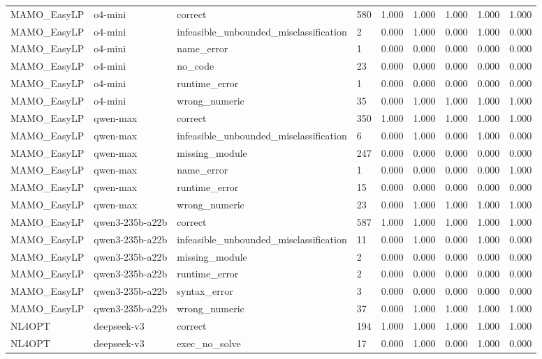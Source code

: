 \begin{table}[t]
\begin{tabular}{lllllllll}
MAMO\_EasyLP & o4-mini & correct & 580 & 1.000 & 1.000 & 1.000 & 1.000 & 1.000 \\
MAMO\_EasyLP & o4-mini & infeasible\_unbounded\_misclassification & 2 & 0.000 & 1.000 & 0.000 & 1.000 & 0.000 \\
MAMO\_EasyLP & o4-mini & name\_error & 1 & 0.000 & 0.000 & 0.000 & 0.000 & 0.000 \\
MAMO\_EasyLP & o4-mini & no\_code & 23 & 0.000 & 0.000 & 0.000 & 0.000 & 0.000 \\
MAMO\_EasyLP & o4-mini & runtime\_error & 1 & 0.000 & 0.000 & 0.000 & 0.000 & 0.000 \\
MAMO\_EasyLP & o4-mini & wrong\_numeric & 35 & 0.000 & 1.000 & 1.000 & 1.000 & 1.000 \\
MAMO\_EasyLP & qwen-max & correct & 350 & 1.000 & 1.000 & 1.000 & 1.000 & 1.000 \\
MAMO\_EasyLP & qwen-max & infeasible\_unbounded\_misclassification & 6 & 0.000 & 1.000 & 0.000 & 1.000 & 0.000 \\
MAMO\_EasyLP & qwen-max & missing\_module & 247 & 0.000 & 0.000 & 0.000 & 0.000 & 0.000 \\
MAMO\_EasyLP & qwen-max & name\_error & 1 & 0.000 & 0.000 & 0.000 & 0.000 & 1.000 \\
MAMO\_EasyLP & qwen-max & runtime\_error & 15 & 0.000 & 0.000 & 0.000 & 0.000 & 0.000 \\
MAMO\_EasyLP & qwen-max & wrong\_numeric & 23 & 0.000 & 1.000 & 1.000 & 1.000 & 1.000 \\
MAMO\_EasyLP & qwen3-235b-a22b & correct & 587 & 1.000 & 1.000 & 1.000 & 1.000 & 1.000 \\
MAMO\_EasyLP & qwen3-235b-a22b & infeasible\_unbounded\_misclassification & 11 & 0.000 & 1.000 & 0.000 & 1.000 & 0.000 \\
MAMO\_EasyLP & qwen3-235b-a22b & missing\_module & 2 & 0.000 & 0.000 & 0.000 & 0.000 & 0.000 \\
MAMO\_EasyLP & qwen3-235b-a22b & runtime\_error & 2 & 0.000 & 0.000 & 0.000 & 0.000 & 0.000 \\
MAMO\_EasyLP & qwen3-235b-a22b & syntax\_error & 3 & 0.000 & 0.000 & 0.000 & 0.000 & 0.000 \\
MAMO\_EasyLP & qwen3-235b-a22b & wrong\_numeric & 37 & 0.000 & 1.000 & 1.000 & 1.000 & 1.000 \\
NL4OPT & deepseek-v3 & correct & 194 & 1.000 & 1.000 & 1.000 & 1.000 & 1.000 \\
NL4OPT & deepseek-v3 & exec\_no\_solve & 17 & 0.000 & 1.000 & 0.000 & 1.000 & 0.000 \\

\end{tabular}
\end{table}
